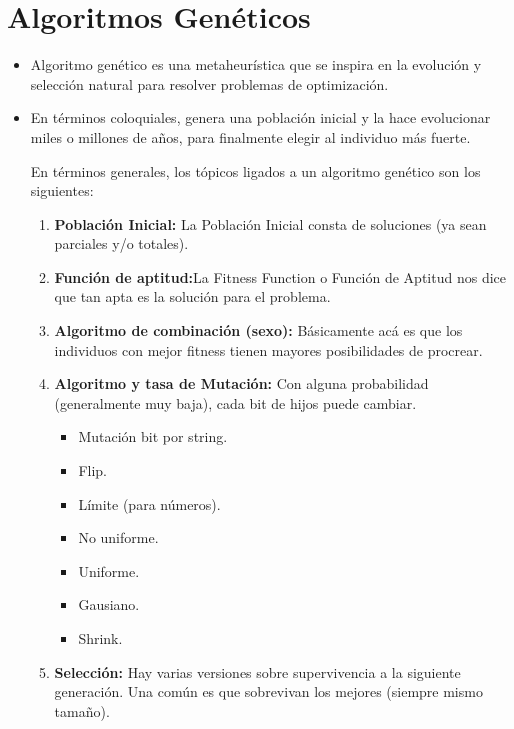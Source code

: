 \documentclass{templateNote}
\begin{document}
\section{Algoritmos Genéticos}
\begin{itemize}
    \item Algoritmo genético es una metaheurística que se inspira en la evolución y selección natural para resolver problemas de optimización.
    
    \item En términos coloquiales, genera una población inicial y la hace evolucionar miles o millones de años, para finalmente elegir al individuo más fuerte.
    
    \newpage
    En términos generales, los tópicos ligados a un algoritmo genético son los siguientes:
    \begin{enumerate}
        \item \textbf{Población Inicial:} La Población Inicial consta de soluciones (ya sean parciales y/o totales).

        \item \textbf{Función de aptitud:}La Fitness Function o Función de Aptitud nos dice que tan apta es la solución para el problema.
        
        \item \textbf{Algoritmo de combinación (sexo):} Básicamente acá es que los individuos con mejor fitness tienen mayores posibilidades de procrear.

        \item \textbf{Algoritmo y tasa de Mutación:} Con alguna probabilidad (generalmente muy baja), cada bit de hijos puede cambiar.
        \begin{itemize}
            \item Mutación bit por string.
            
            \item Flip.
            
            \item Límite (para números).
            
            \item No uniforme.
            
            \item Uniforme.
            
            \item Gausiano.
            
            \item Shrink.
        \end{itemize}
        \item \textbf{Selección:} Hay varias versiones sobre supervivencia a la siguiente generación. Una común es que sobrevivan los mejores (siempre mismo tamaño).

    \end{enumerate}

\end{itemize}
\end{document}

